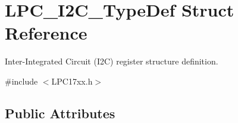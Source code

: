 \hypertarget{struct_l_p_c___i2_c___type_def}{\section{\-L\-P\-C\-\_\-\-I2\-C\-\_\-\-Type\-Def \-Struct \-Reference}
\label{struct_l_p_c___i2_c___type_def}
}


\-Inter-\/\-Integrated \-Circuit (\-I2\-C) register structure definition.  




{\ttfamily \#include $<$\-L\-P\-C17xx.\-h$>$}

\subsection*{\-Public \-Attributes}
